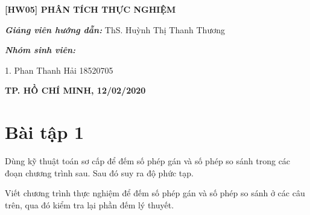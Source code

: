 \documentclass[12pt, a4paper, fleqn]{article}
\begin{document}
\begin{titlepage}
\begin{center}
			\vspace{1.5cm}
			
			\Large
			\textbf{[HW05] PHÂN TÍCH THỰC NGHIỆM}
		
		\end{center}
			
			\vspace{3cm}
			\normalsize	
			
			\hspace{70pt} \textbf{\textit{Giảng viên hướng dẫn:}} ThS. Huỳnh Thị Thanh Thương\\
			
			\vspace*{1.5cm}
			
			\hspace{70pt} \textbf{\textit{Nhóm sinh viên:}}
			
			\vspace*{0.4cm}
			
			\hspace{70pt} 1. \hspace{10pt} Phan Thanh Hải  \hspace{45pt} 18520705
			
			\vspace{4cm}
		
		\begin{center}
			\textbf{TP. HỒ CHÍ MINH, 12/02/2020}
		\end{center}
			
	\end{titlepage}

	\begin{center}
		\tableofcontents
	\end{center}
	\clearpage
	
	\setlength{\abovedisplayskip}{5pt}
	\setlength{\belowdisplayskip}{5pt}
	
	
	\section*{Bài tập 1}
	
	
	Dùng kỹ thuật toán sơ cấp để đếm số phép gán và số phép so sánh trong các đoạn chương trình sau. Sau đó suy ra độ phức tạp.
	
	Viết chương trình thực nghiệm để đếm số phép gán và số phép so sánh ở các câu trên, qua đó kiểm tra lại phần đếm lý thuyết.
	
\end{document}
